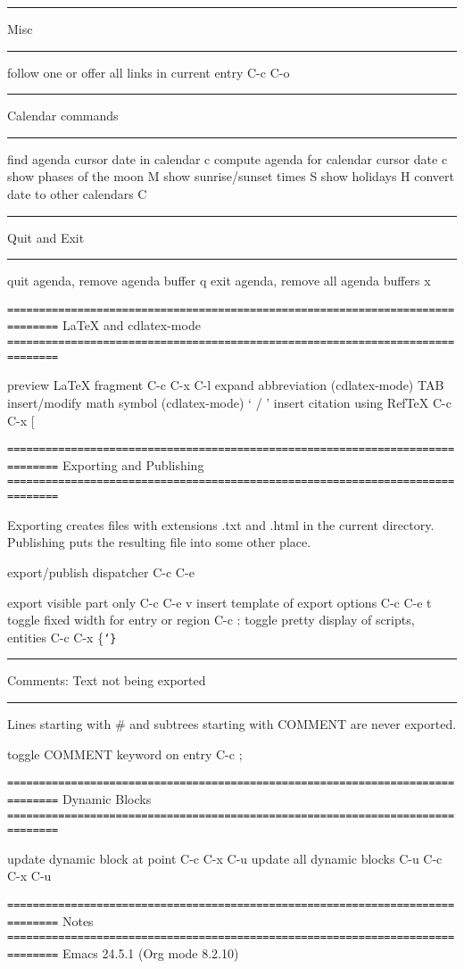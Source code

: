 \documentclass[10pt,a4paper]{article}
\begin{document}
\rule{\linewidth}{0.5pt}
Misc

\rule{\linewidth}{0.5pt}

follow one or offer all links in current entry    C-c C-o

\rule{\linewidth}{0.5pt}
Calendar commands

\rule{\linewidth}{0.5pt}

find agenda cursor date in calendar               c
compute agenda for calendar cursor date           c
show phases of the moon                           M
show sunrise/sunset times                         S
show holidays                                     H
convert date to other calendars                   C

\rule{\linewidth}{0.5pt}
Quit and Exit

\rule{\linewidth}{0.5pt}

quit agenda, remove agenda buffer                 q
exit agenda, remove all agenda buffers            x

\texttt{==============================================================================}
\LaTeX{} and cdlatex-mode
\texttt{==============================================================================}

preview \LaTeX{} fragment                            C-c C-x C-l
expand abbreviation (cdlatex-mode)                TAB
insert/modify math symbol (cdlatex-mode)          ` / '
insert citation using RefTeX                      C-c C-x [

\texttt{==============================================================================}
Exporting and Publishing
\texttt{==============================================================================}

Exporting creates files with extensions .txt and .html
in the current directory.  Publishing puts the resulting file into
some other place.

export/publish dispatcher                         C-c C-e

export visible part only                          C-c C-e v
insert template of export options                 C-c C-e t
toggle fixed width for entry or region            C-c :
toggle pretty display of scripts, entities        C-c C-x \{\tt\char`\}

\rule{\linewidth}{0.5pt}
Comments: Text not being exported

\rule{\linewidth}{0.5pt}

Lines starting with \# and subtrees starting with COMMENT are
never exported.

toggle COMMENT keyword on entry                   C-c ;

\texttt{==============================================================================}
Dynamic Blocks
\texttt{==============================================================================}

update dynamic block at point                     C-c C-x C-u
update all dynamic blocks                         C-u C-c C-x C-u

\texttt{==============================================================================}
Notes
\texttt{==============================================================================}
Emacs 24.5.1 (Org mode 8.2.10)
\end{document}
